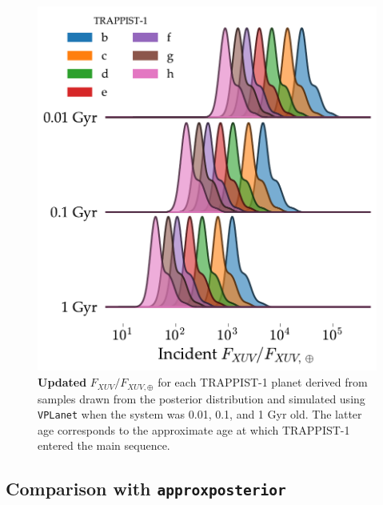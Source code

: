 \documentclass[twocolumn]{aastex62}
\newcommand{\xxx}[1]{{\textbf{#1}}}
\newcommand{\vplanet}[0]{\texttt{VPLanet}\xspace}
\newcommand{\approxposterior}[0]{\texttt{approxposterior}\xspace}
\begin{document}
\begin{figure}
	\includegraphics[width=\columnwidth]{../Analysis/Fluxes/fluxes.pdf}
   \caption{\xxx{Updated} $F_{XUV}/F_{XUV,\oplus}$ for each TRAPPIST-1 planet derived from samples drawn from the posterior distribution and simulated using \vplanet when the system was 0.01, 0.1, and 1 Gyr old. The latter age corresponds to the approximate age at which TRAPPIST-1 entered the main sequence.}%
    \label{fig:fluxes}%
\end{figure}


\subsection{Comparison with \approxposterior} \label{sec:approx}

\end{document}
